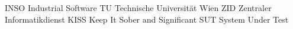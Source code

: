 	{INSO}	{Industrial Software}
	{TU}	{Technische Universit\"at Wien}
	{ZID}	{Zentraler Informatikdienst}
	{KISS}	{Keep It Sober and Significant}
	{SUT}	{System Under Test}

